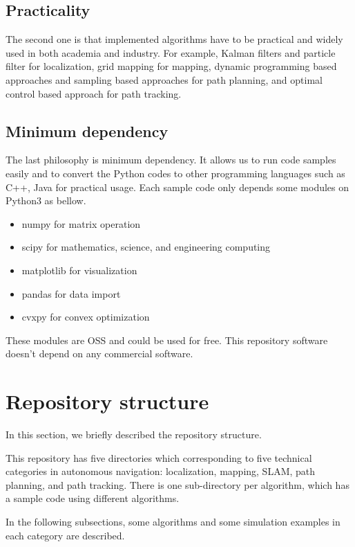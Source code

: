 \documentclass{bmvc2k}
\begin{document}
\subsection{Practicality}
The second one is that implemented algorithms have to be practical and widely used in both academia and industry.
For example, Kalman filters and particle filter for localization, grid mapping for mapping, dynamic programming based approaches and sampling based approaches for path planning, and optimal control based approach for path tracking.

\subsection{Minimum dependency}
The last philosophy is minimum dependency.
It allows us to run code samples easily and to convert the Python codes to other programming languages such as C++, Java for practical usage.
Each sample code only depends some modules on Python3 as bellow.

\begin{itemize}
 \item numpy\cite{numpy} for matrix operation
 \item scipy\cite{scipy} for mathematics, science, and engineering computing
 \item matplotlib\cite{matplotlib} for visualization
 \item pandas\cite{pandas} for data import
 \item cvxpy\cite{cvxpy} for convex optimization
\end{itemize}

These modules are OSS and could be used for free.
This repository software doesn't depend on any commercial software.


\section{Repository structure}

In this section, we briefly described the repository structure.

This repository has five directories which corresponding to five technical categories in autonomous navigation: localization, mapping, SLAM, path planning, and path tracking.
There is one sub-directory per algorithm, which has a sample code using different algorithms.

In the following subsections, some algorithms and some simulation examples in each category are described.
\end{document}
